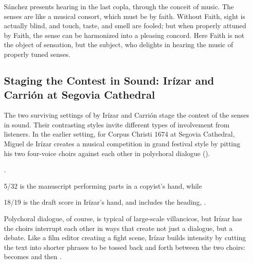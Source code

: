 Sánchez presents hearing in the last copla, through the conceit of music.
The senses are  like a musical consort, which must be  by faith.
Without Faith, sight is actually blind, and touch, taste, and smell are fooled; but when properly attuned by Faith, the sense can be harmonized into a pleasing concord.
Here Faith is not the object of sensation, but the subject, who delights in hearing the music of properly tuned senses.

\subsection{Staging the Contest in Sound: Irízar and Carrión at Segovia Cathedral}


The two surviving settings of  by Irízar and Carrión stage the contest of the senses in sound.
Their contrasting styles invite different types of involvement from listeners.
In the earlier setting, for Corpus Christi 1674 at Segovia Cathedral, Miguel de Irízar creates a musical competition in grand festival style by pitting his two four-voice choirs against each other in polychoral dialogue ().%
\begin{Footnote}
  \Autocite[\XXX]{Cashner:SingingAboutSingingI}.
  \signature{E-SE}{5/32} is the manuscript performing parts in a copyist's hand, while \signature{E-SE}{18/19} is the draft score in Irízar's hand, and includes the heading, .
\end{Footnote}
Polychoral dialogue, of course, is typical of large-scale villancicos, but Irízar has the choirs interrupt each other in ways that create not just a dialogue, but a debate.
Like a film editor creating a fight scene, Irízar builds intensity by cutting the text into shorter phrases to be tossed back and forth between the two choirs:  becomes  and then .


